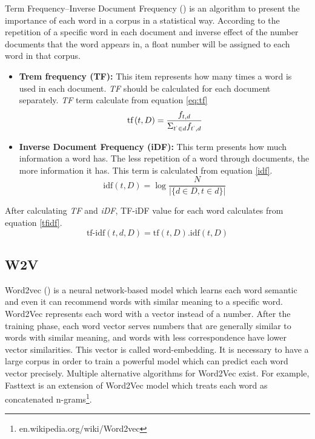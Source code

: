 Term Frequency–Inverse Document Frequency (\cite{tfidf}) is an algorithm to present the importance of each word in a corpus in a statistical way. According to the repetition of a specific word in each document and inverse effect of the number documents that the word appears in, a float number will be assigned to each word in that corpus.  
\begin{itemize}
	\item \textbf{Trem frequency (TF):} This item represents how many times a word is used in each document. \textit{TF} should be calculated for each document separately. \textit{TF} term calculate from equation \ref{eq:tf}
	\begin{equation}
	\label{eq:tf}
	\text{tf} \left(t,D\right) = \frac{f_{t,d}}{\Sigma_{t^{`} \in d } f_{t^{`}, d}}
	\end{equation}
	
	\item \textbf{Inverse Document Frequency (iDF):} This term presents how much information a word has. The less repetition of a word through documents, the more information it has. This term is calculated from equation \ref{idf}. 
	\begin{equation}
	\label{idf}
	\text{idf} \left( t,D\right) = \log \frac{N}{\left|\{d\in D, t \in d\}\right| }
	\end{equation}
\end{itemize}

\noindent
After calculating \textit{TF} and \textit{iDF}, TF-iDF value for each word calculates from equation \ref{tfidf}.
\begin{equation}
\label{tfidf}
\text{tf-idf}\left(t,d,D\right) =  \text{tf} \left( t,D\right) . \text{idf} \left( t,D\right)
\end{equation}


\subsection{W2V}
Word2vec (\cite{word2vec}) is a neural network-based model which learns each word semantic and even it can recommend words with similar meaning to a specific word. Word2Vec represents each word with a vector instead of a number. After the training phase, each word vector serves numbers that are generally similar to words with similar meaning, and words with less correspondence have lower vector similarities. This vector is called word-embedding. It is necessary to have a large corpus in order to train a powerful model which can predict each word vector precisely. Multiple alternative algorithms for Word2Vec exist. For example, Fasttext is an extension of Word2Vec model which treats each word as concatenated n-grams\footnote{en.wikipedia.org/wiki/Word2vec}.  



